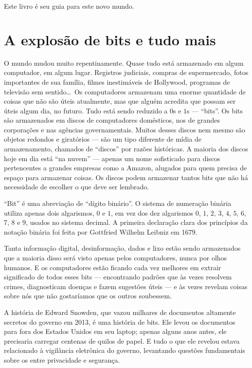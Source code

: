 Este livro é seu guia para este novo mundo.


\section{A explosão de bits e tudo mais}
\label{cap1:exp-dig-bits}

O mundo mudou muito repentinamente. Quase tudo está armazenado em algum 
computador, em algum lugar. Registros judiciais, compras de supermercado,
fotos importantes de sua família, filmes inestimáveis de Hollywood, programas de
televisão sem sentido\ldots\ Os computadores armazenam uma enorme quantidade de
coisas que não são úteis atualmente, mas que alguém acredita que possam ser
úteis algum dia, no futuro. Tudo está sendo reduzido a $0$s e $1$s ---
``bits''. Os bits são armazenados em discos de computadores domésticos, nos
 de grandes corporações e nas agências
governamentais. Muitos desses discos nem mesmo são objetos redondos e
giratórios --- são um tipo diferente de mídia de armazenamento, chamados de
``discos'' por razões históricas. A maioria dos discos hoje em dia está ``na
nuvem'' --- apenas um nome sofisticado para discos pertencentes a grandes 
empresas como a Amazon, alugados para quem precisa de espaço para armazenar 
coisas. Os discos podem armazenar tantos bits que não há necessidade de escolher
o que deve ser lembrado.

\begin{tcolorbox}
``Bit'' é uma abreviação de ``dígito binário''. O sistema de numeração binária
utiliza apenas dois algarismos, $0$ e $1$, em vez dos dez algarismos $0$, $1$,
$2$, $3$, $4$, $5$, $6$, $7$, $8$ e $9$, usados no sistema decimal. A primeira
declaração clara dos princípios da notação binária foi feita por Gottfried
Wilhelm Leibniz em 1679.
\end{tcolorbox}

Tanta informação digital, desinformação, dados e lixo estão sendo armazenados 
que a maioria disso será visto apenas pelos computadores, nunca por olhos
humanos. E os computadores estão ficando cada vez melhores em extrair 
significado de todos esses bits --- encontrando padrões que às vezes resolvem
crimes, diagnosticam doenças e fazem sugestões úteis --- e às vezes revelam
coisas sobre nós que não gostaríamos que os outros soubessem.

A história de Edward Snowden, que vazou milhares de documentos altamente
secretos do governo em 2013, é uma história de bits. Ele levou os documentos 
para fora dos Estados Unidos em seu laptop; apenas alguns anos antes, ele
precisaria carregar centenas de quilos de papel. E tudo o que ele revelou estava
relacionado à vigilância eletrônica do governo, levantando questões fundamentais
sobre os  entre privacidade e segurança.

